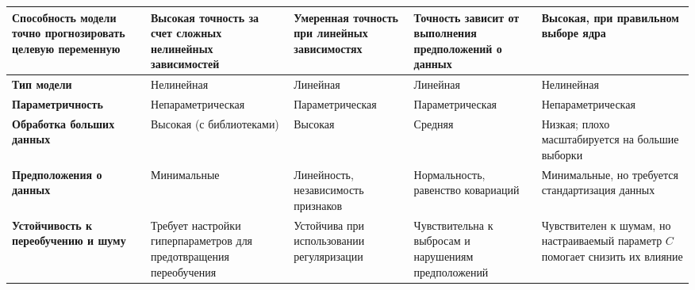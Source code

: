 {\begin{longtable}{|p{3cm}|p{3cm}|p{3cm}|p{3cm}|p{3cm}|}
  \textbf{Способность модели точно прогнозировать целевую переменную}          & Высокая точность за счет сложных нелинейных зависимостей                            & Умеренная точность при линейных зависимостях          & Точность зависит от выполнения предположений о данных                         & Высокая, при правильном выборе ядра                                               \\ \hline
  \textbf{Тип модели}                                                          & Нелинейная                                                                          & Линейная                                              & Линейная                                                                      & Нелинейная                                                                        \\ \hline
  \textbf{Параметричность}                                                     & Непараметрическая                                                                   & Параметрическая                                       & Параметрическая                                                               & Непараметрическая                                                                 \\ \hline
  \textbf{Обработка больших данных}                                            & Высокая (с библиотеками)                                                            & Высокая                                               & Средняя                                                                       & Низкая; плохо масштабируется на большие выборки                                   \\ \hline
  \textbf{Предположения о данных}                                              & Минимальные                                                                         & Линейность, независимость признаков                   & Нормальность, равенство ковариаций                                            & Минимальные, но требуется стандартизация данных                                   \\ \hline
  \textbf{Устойчивость к переобучению и шуму}                                  & Требует настройки гиперпараметров для предотвращения переобучения                   & Устойчива при использовании регуляризации             & Чувствительна к выбросам и нарушениям предположений                           & Чувствителен к шумам, но настраиваемый параметр \(C\) помогает снизить их влияние \\ \hline

\end{longtable}}

